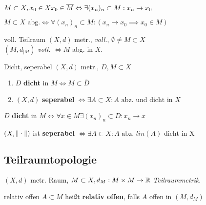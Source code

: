 \begin{lemma}
  $M \subset X, x_0 \in X\\ x_0 \in \overline{M} \Leftrightarrow
  \exists (x_n)_n \subset M: x_n \to x_0$
\end{lemma}

\begin{korrolar}
  $M \subset X \text{ abg.} \Leftrightarrow \forall (x_n)_n \subset M:
  {(x_n \to x_0 \implies x_0 \in M)}$
\end{korrolar}

\begin{satz}{voll. Teilraum}
  $(X,d)$ metr., \textit{voll.}, $\emptyset \neq M \subset X$\\
  $(M,d_{|M})$ \textit{voll.} $\Leftrightarrow M$ abg. in $X$.
\end{satz}

\dheel

\begin{definition}{Dicht, seperabel}
  $(X,d)$ metr., $D,M \subset X$
  \begin{enumerate}[label = (\arabic*)]
    \item $D$ \textbf{dicht} in $M \Leftrightarrow M \subset \overline{D}$
    \item $(X,d)$ \textbf{seperabel} $\Leftrightarrow \exists A \subset X:
    A \text{ abz. und dicht in }X$
  \end{enumerate}
\end{definition}

$D$ \textbf{dicht} in $M \Leftrightarrow \forall x
\in M \exists (x_n)_n \subset D: x_n \to x$
\heel

\begin{lemma}
  $(X, \|\cdot\|)$ ist \textbf{seperabel} $\Leftrightarrow
  \exists A \subset X: A \text{ abz. } lin(A) \text{ dicht in X}$
\end{lemma}



\subsection{Teilraumtopologie}
$(X,d)$ metr. Raum, ${M \subset X, d_M:M\times M \to \mathbb{R}}$
\textit{Teilraummetrik}.

\begin{definition}{relativ offen}
  $A \subset M$ heißt \textbf{relativ offen}, falls $A$ offen in $(M,d_M)$
\end{definition}



